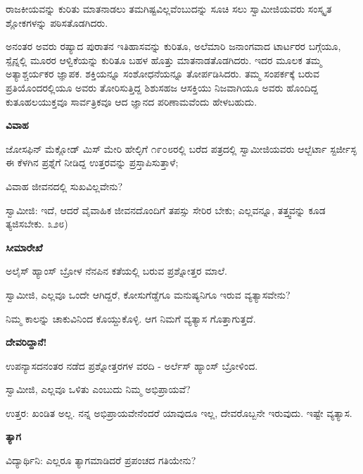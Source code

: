 ರಾಜಕೀಯವನ್ನು ಕುರಿತು ಮಾತನಾಡಲು ತಮಗಿಷ್ಟವಿಲ್ಲವೆಂಬುದನ್ನು ಸೂಚಿ ಸಲು ಸ್ವಾಮೀಜಿಯವರು ಸಂಸ್ಕೃತ ಶ್ಲೋಕಗಳನ್ನು ಪಠಿಸತೊಡಗಿದರು.

ಅನಂತರ ಅವರು ರಷ್ಯಾದ ಪುರಾತನ ಇತಿಹಾಸವನ್ನು ಕುರಿತೂ, ಅಲೆಮಾರಿ ಜನಾಂಗವಾದ ಟಾರ್ಟರರ ಬಗ್ಗೆಯೂ, ಸ್ಪೈನ್ನಲ್ಲಿ ಮೂರರ ಆಳ್ವಿಕೆಯನ್ನು ಕುರಿತೂ ಬಹಳ ಹೊತ್ತು ಮಾತನಾಡತೊಡಗಿದರು. ಇದರ ಮೂಲಕ ತಮ್ಮ ಅತ್ಯಾಶ್ಚರ್ಯಕರ ಜ್ಞಾಪಕ. ಶಕ್ತಿಯನ್ನೂ ಸಂಶೋಧನೆಯನ್ನೂ ತೋರ್ಪಡಿಸಿದರು. ತಮ್ಮ ಸಂಪರ್ಕಕ್ಕೆ ಬರುವ ಪ್ರತಿಯೊಂದರಲ್ಲಿಯೂ ಅವರು ತೋರಿಸುತ್ತಿದ್ದ ಶಿಶುಸಹಜ ಆಸಕ್ತಿಯು ನಿಜವಾಗಿಯೂ ಅವರು ಹೊಂದಿದ್ದ ಕುತೂಹಲಯುಕ್ತವೂ ಸಾರ್ವತ್ರಿಕವೂ ಆದ ಜ್ಞಾನದ ಪರಿಣಾಮವೆಂದು ಹೇಳಬಹುದು.

\begin{center}
\textbf{ವಿವಾಹ}
\end{center}

ಜೋಸಫಿನ್ ಮೆಕ್ಲೋಡ್ ಮಿಸ್ ಮೇರಿ ಹೇಲ್ಳಿಗೆ ೧೯೦೮ರಲ್ಲಿ ಬರೆದ ಪತ್ರದಲ್ಲಿ ಸ್ವಾಮೀಜಿಯವರು ಆಲ್ಬೆರ್ಟಾ ಸ್ಟರ್ಜೀಸ್ಳ ಈ ಕೆಳಗಿನ ಪ್ರಶ್ನೆಗೆ ನೀಡಿದ್ದ ಉತ್ತರವನ್ನು ಪ್ರಸ್ತಾಪಿಸುತ್ತಾಳೆ;

ವಿವಾಹ ಜೀವನದಲ್ಲಿ ಸುಖವಿಲ್ಲವೇನು?

ಸ್ವಾಮೀಜಿ: ಇದೆ, ಆದರೆ ವೈವಾಹಿಕ ಜೀವನದೊಂದಿಗೆ ತಪಸ್ಸು ಸೇರಿರ ಬೇಕು; ಎಲ್ಲವನ್ನೂ, ತತ್ತ್ವವನ್ನು ಕೂಡ ತ್ಯಜಿಸಬೇಕು.  ೩೨೮)

\begin{center}
\textbf{ಸೀಮಾರೇಖೆ}
\end{center}

ಅಲೈಸ್ ಹ್ಯಾಂಸ್ ಬ್ರೋಳ ನೆನಪಿನ ಕತೆಯಲ್ಲಿ ಬರುವ ಪ್ರಶ್ನೋತ್ತರ ಮಾಲೆ.

ಸ್ವಾಮೀಜಿ, ಎಲ್ಲವೂ ಒಂದೇ ಆಗಿದ್ದರೆ, ಕೋಸುಗೆಡ್ಡೆಗೂ ಮನುಷ್ಯನಿಗೂ ಇರುವ ವ್ಯತ್ಯಾಸವೇನು?

ನಿಮ್ಮ ಕಾಲನ್ನು ಚಾಕುವಿನಿಂದ ಕೊಯ್ದುಕೊಳ್ಳಿ. ಆಗ ನಿಮಗೆ ವ್ಯತ್ಯಾಸ ಗೊತ್ತಾಗುತ್ತದೆ.

\begin{center}
\textbf{ದೇವರಿದ್ದಾನೆ!}
\end{center}

ಉಪನ್ಯಾಸದನಂತರ ನಡೆದ ಪ್ರಶ್ನೋತ್ತರಗಳ ವರದಿ - ಅರ್ಲೆಸ್ ಹ್ಯಾಂಸ್ ಬ್ರೋಳಿಂದ.

ಸ್ವಾಮೀಜಿ, ಎಲ್ಲವೂ ಒಳಿತು ಎಂಬುದು ನಿಮ್ಮ ಅಭಿಪ್ರಾಯವೆ?

ಉತ್ತರ: ಖಂಡಿತ ಅಲ್ಲ. ನನ್ನ ಅಭಿಪ್ರಾಯವೇನೆಂದರೆ ಯಾವುದೂ ಇಲ್ಲ, ದೇವರೊಬ್ಬನೇ ಇರುವುದು. ಇಷ್ಟೇ ವ್ಯತ್ಯಾಸ.

\begin{center}
\textbf{ತ್ಯಾಗ}
\end{center}

ವಿದ್ಯಾರ್ಥಿನಿ: ಎಲ್ಲರೂ ತ್ಯಾಗಮಾಡಿದರೆ ಪ್ರಪಂಚದ ಗತಿಯೇನು?

